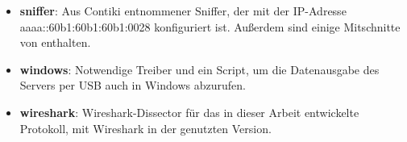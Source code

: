 \begin{itemize}
  \item \textbf{sniffer}: Aus Contiki entnommener Sniffer, der mit der IP-Adresse aaaa::60b1:60b1:60b1:0028 \newline konfiguriert ist. Außerdem sind einige Mitschnitte von  enthalten.
  \item \textbf{windows}: Notwendige Treiber und ein Script, um die Datenausgabe des Servers \newline per USB auch in Windows abzurufen.
  \item \textbf{wireshark}: Wireshark-Dissector für das in dieser Arbeit entwickelte Protokoll, \newline mit Wireshark in der genutzten Version.
\end{itemize}
